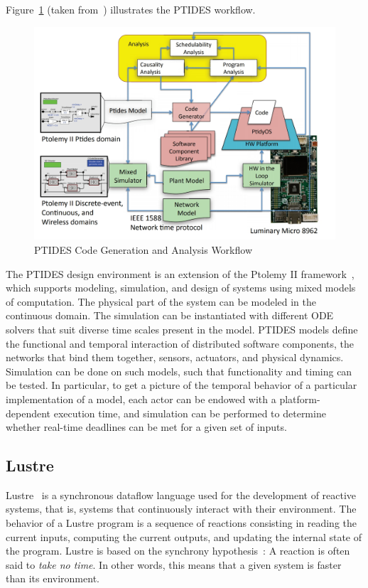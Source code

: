 Figure~\ref{fig:ptides} (taken from~\cite{intro:ptides}) illustrates the PTIDES workflow.
\begin{figure}[h]
  \includegraphics[scale=0.3]{Figures/ptides}
  \caption{PTIDES Code Generation and Analysis Workflow}
  \label{fig:ptides}
\end{figure}

The PTIDES design environment is an extension of the Ptolemy II framework~\cite{intro:ptides3},
which supports modeling, simulation, and design of systems using mixed models of computation. 
The physical part of the system can be modeled in the continuous domain. The simulation can be 
instantiated with different ODE solvers that suit diverse time scales present in the model. 
PTIDES models define the functional and temporal interaction of distributed software components,
the networks that bind them together, sensors, actuators, and physical dynamics. 
Simulation can be done on such models, such that functionality and timing can be 
tested. In particular, to get a picture of the temporal behavior
of a particular implementation of a model, each actor can
be endowed with a platform-dependent execution time, and
simulation can be performed to determine whether real-time
deadlines can be met for a given set of inputs.


\subsection{Lustre}


Lustre~\cite{intro:lustre} is a synchronous dataflow language used for the development of 
reactive systems, that is, systems that continuously interact with their environment.
The behavior of a Lustre program is a sequence of reactions consisting in reading the current 
inputs, computing the current outputs, and updating the internal state of the program. 
Lustre is based on the synchrony hypothesis~\cite{intro:lustre2}: A reaction is often said to 
\emph{take no time}. In other words, this means that a given system is faster than its 
environment. 

